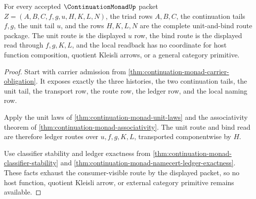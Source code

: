 \begin{theorem}
\label{thm:continuation-monad-triad-unit-route-package}
For every accepted $\ContinuationMonadUp$ packet $Z=(A,B,C,f,g,u,H,K,L,N)$, the triad rows $A,B,C$, the continuation tails $f,g$, the unit tail $u$, and the rows $H,K,L,N$ are the complete unit-and-bind route package. The unit route is the displayed $u$ row, the bind route is the displayed read through $f,g,K,L$, and the local readback has no coordinate for host function composition, quotient Kleisli arrows, or a general category primitive.
\end{theorem}
\begin{proof}
Start with carrier admission from \autoref{thm:continuation-monad-carrier-obligation}. It exposes exactly the three histories, the two continuation tails, the unit tail, the transport row, the route row, the ledger row, and the local naming row.

Apply the unit laws of \autoref{thm:continuation-monad-unit-laws} and the associativity theorem of \autoref{thm:continuation-monad-associativity}. The unit route and bind read are therefore ledger routes over $u,f,g,K,L$, transported componentwise by $H$.

Use classifier stability and ledger exactness from \autoref{thm:continuation-monad-classifier-stability} and \autoref{thm:continuation-monad-namecert-ledger-exactness}. These facts exhaust the consumer-visible route by the displayed packet, so no host function, quotient Kleisli arrow, or external category primitive remains available.
\end{proof}

